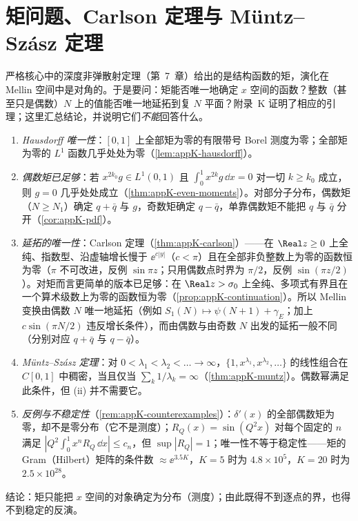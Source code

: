 \section{矩问题、Carlson 定理与 Müntz--Szász 定理}\label{sec:prelim-moments}

严格核心中的深度非弹散射定理（第~7~章）给出的是结构函数的矩，演化在 Mellin 空间中是对角的。于是要问：矩能否唯一地确定 $x$ 空间的函数？整数（甚至只是偶数）$N$ 上的值能否唯一地延拓到复 $N$ 平面？附录~K 证明了相应的引理；这里汇总结论，并说明它们\emph{不能}回答什么。

\begin{remark}[矩问题工具箱]\label{rem:prelim-moment-tools}
\begin{enumerate}[label=(\roman*),leftmargin=2.2em,itemsep=0pt,topsep=2pt]
\item \emph{Hausdorff 唯一性}：$[0,1]$ 上全部矩为零的有限带号 Borel 测度为零；全部矩为零的 $L^1$ 函数几乎处处为零（\cref{lem:appK-hausdorff}）。
\item \emph{偶数矩已足够}：若 $x^{2k_0}g\in L^1(0,1)$ 且 $\int_0^1x^{2k}g\,\dd x=0$ 对一切 $k\ge k_0$ 成立，则 $g=0$ 几乎处处成立（\cref{thm:appK-even-moments}）。对部分子分布，偶数矩（$N\ge N_1$）确定 $q+\bar q$ 与 $g$，奇数矩确定 $q-\bar q$，单靠偶数矩不能把 $q$ 与 $\bar q$ 分开（\cref{cor:appK-pdf}）。
\item \emph{延拓的唯一性}：Carlson 定理（\cref{thm:appK-carlson}）——在 $\Real z\ge0$ 上全纯、指数型、沿虚轴增长慢于 $\ee^{c|y|}$（$c<\pi$）且在全部非负整数上为零的函数恒为零（$\pi$ 不可改进，反例 $\sin\pi z$；只用偶数点时界为 $\pi/2$，反例 $\sin(\pi z/2)$）。对矩而言更简单的版本已足够：在 $\Real z>\sigma_0$ 上全纯、多项式有界且在一个算术级数上为零的函数恒为零（\cref{prop:appK-continuation}）。所以 Mellin 变换由偶数 $N$ 唯一地延拓（例如 $S_1(N)\mapsto\psi(N+1)+\gamma_E$；加上 $c\sin(\pi N/2)$ 违反增长条件），而由偶数与由奇数 $N$ 出发的延拓一般不同（分别对应 $q+\bar q$ 与 $q-\bar q$）。
\item \emph{Müntz--Szász 定理}：对 $0<\lambda_1<\lambda_2<\dots\to\infty$，$\{1,x^{\lambda_1},x^{\lambda_2},\dots\}$ 的线性组合在 $C[0,1]$ 中稠密，当且仅当 $\sum_k1/\lambda_k=\infty$（\cref{thm:appK-muntz}）。偶数幂满足此条件，但 (ii) 并不需要它。
\item \emph{反例与不稳定性}（\cref{rem:appK-counterexamples}）：$\delta'(x)$ 的全部偶数矩为零，却不是零分布（它不是测度）；$R_Q(x)=\sin(Q^2x)$ 对每个固定的 $n$ 满足 $|Q^2\int_0^1x^nR_Q\,\dd x|\le c_n$，但 $\sup|R_Q|=1$；唯一性不等于稳定性——矩的 Gram（Hilbert）矩阵的条件数 $\approx\ee^{3.5K}$，$K=5$ 时为 $4.8\times10^5$，$K=20$ 时为 $2.5\times10^{28}$。%
\end{enumerate}
结论：矩只能把 $x$ 空间的对象确定为分布（测度）；由此既得不到逐点的界，也得不到稳定的反演。
\end{remark}

